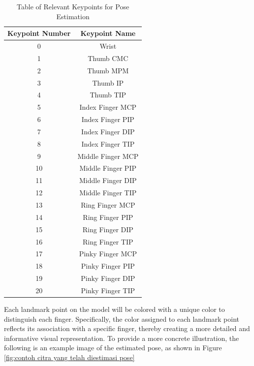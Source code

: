 \begin{table}[h]
  \caption{Table of Relevant Keypoints for Pose Estimation\cite{Developer_2023}}
  \label{tbl:titik keypoints}
  \centering
  \begin{tabular}{|c|c|}
    \hline
    Keypoint Number& Keypoint Name     \\ \hline
    0              & Wrist              \\ \hline
    1              & Thumb CMC        \\ \hline
    2              & Thumb MPM        \\ \hline
    3              & Thumb IP         \\ \hline
    4              & Thumb TIP        \\ \hline
    5              & Index Finger MCP       \\ \hline
    6              & Index Finger PIP       \\ \hline
    7              & Index Finger DIP       \\ \hline
    8              & Index Finger TIP       \\ \hline
    9              & Middle Finger MCP     \\ \hline
    10             & Middle Finger PIP     \\ \hline
    11             & Middle Finger DIP     \\ \hline
    12             & Middle Finger TIP     \\ \hline
    13             & Ring Finger MCP     \\ \hline
    14             & Ring Finger PIP     \\ \hline
    15             & Ring Finger DIP     \\ \hline
    16             & Ring Finger TIP     \\ \hline
    17             & Pinky Finger MCP     \\ \hline
    18             & Pinky Finger PIP     \\ \hline
    19             & Pinky Finger DIP     \\ \hline
    20             & Pinky Finger TIP     \\ \hline
  \end{tabular}
\end{table}

Each landmark point on the model will be colored with a unique color to distinguish each finger. Specifically, the color assigned to each landmark point reflects its association with a specific finger, thereby creating a more detailed and informative visual representation. To provide a more concrete illustration, the following is an example image of the estimated pose, as shown in Figure \ref{fig:contoh citra yang telah diestimasi pose}

